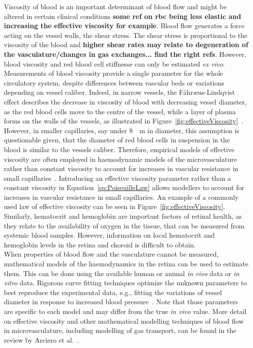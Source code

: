 \documentclass[12pt,a4paper]{journal}
\begin{document}
Viscosity of blood is an important determinant of blood flow and might be altered in certain clinical conditions \textbf{some ref on rbc being less elastic and increasing the effective viscosity for example}.
Blood flow generates a force acting on the vessel walls, the shear stress.
The shear stress is proportional to the viscosity of the blood and \textbf{higher shear rates may relate to degeneration of the vasculature/changes in gas exchanges... find the right refs}.
However, blood viscosity and red blood cell stiffnesse can only be estimated \textit{ex vivo}.
Measurements of blood viscosity provide a single parameter for the whole circulatory system, despite differences between vascular beds or variations depending on vessel caliber.
Indeed, in narrow vessels, the F\r{a}hr\ae us-Lindqvist effect describes the decrease in viscosity of blood with decreasing vessel diameter, as the red blood cells move to the centre of the vessel, while a layer of plasma forms on the walls of the vessels, as illustrated in Figure~\ref{fig:effectiveViscosity}~\cite{Faahraeus_1931}.
However, in smaller capillaries, say under \SI{8}{\mu\meter} in diameter, this assumption is questionable given, that the diameter of red blood cells in suspension in the blood is similar to the vessels caliber.
Therefore, empirical models of effective viscosity are often employed in haemodynamic models of the microvasculature rather than constant viscosity to account for increases in vascular resistance in small capillaries~\cite{Pries_1990, Haynes_1960}.
Introducing an effective viscosity parameter rather than a constant viscosity in Equation~\ref{eq:PoiseuilleLaw} allows modellers to account for increases in vascular resistance in small capillaries.
An example of a commonly used law of effective viscosity can be seen in Figure~\ref{fig:effectiveViscosity}.\\
Similarly, hematocrit and hemoglobin are important factors of retinal health, as they relate to the availability of oxygen in the tissue, that can be measured from systemic blood samples.
However, information on local hematocrit and hemoglobin levels in the retina and choroid is difficult to obtain.\\
When properties of blood flow and the vasculature cannot be measured, mathematical models of the haemodynamics in the retina can be used to estimate them.
This can be done using the available human or animal \textit{in vivo} data or \textit{in vitro} data.
Rigorous curve fitting techniques optimize the unknown parameters to best reproduce the experimental data, e.g., fitting the variations of vessel diameter in response to increased blood pressure~\cite{Arciero_2013}.
Note that those parameters are specific to each model and may differ from the true \textit{in vivo} value.
More detail on effective viscosity and other mathematical modelling techniques of blood flow in microvasculature, including modelling of gas transport, can be found in the review by Arciero et al.~\cite{Arciero_2017}.
\end{document}
